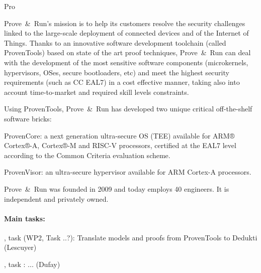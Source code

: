 \begin{sitedescription}{Pro}
\newcommand{\provenrun}[0]{Prove\ \&\ Run}



\provenrun's mission is to help its customers resolve the security
challenges linked to the large-scale deployment of connected devices
and of the Internet of Things. Thanks to an innovative software
development toolchain (called ProvenTools) based on state of the art
proof techniques, \provenrun{} can deal with the development of the
most sensitive software components (microkernels, hypervisors, OSes,
secure bootloaders, etc) and meet the highest security requirements
(such as CC EAL7) in a cost effective manner, taking also into account
time-to-market and required skill levels constraints.

Using ProvenTools, \provenrun{} has developed two unique critical
off-the-shelf software bricks:
\begin{compactitem}
\item ProvenCore: a next generation ultra-secure OS (TEE) available
  for ARM® Cortex®-A, Cortex®-M and RISC-V processors, certified at
  the EAL7 level according to the Common Criteria evaluation scheme.
\item ProvenVisor: an ultra-secure hypervisor available for ARM
  Cortex-A processors.
\end{compactitem}

\provenrun{} was founded in 2009 and today employs 40 engineers. It is
independent and privately owned.

\paragraph*{Main tasks:}



\begin{compactitem}
\item {}, task  (WP2, Task ..?): Translate models and proofs from ProvenTools to Dedukti (Lescuyer)
\item {}, task : ... (Dufay)
\end{compactitem}


\end{sitedescription}

